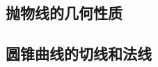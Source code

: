 \subsection{抛物线的几何性质}
\begin{Practice}
  \begin{question}
    \item 
    \item 
    \item 
  \end{question}
\end{Practice}
\begin{Exercise}
  \begin{question}
    \item 
    \item 
    \item 
    \item 
    \item 
    \item 
    \item 
    \item 
    \item 
    \item 
    \item 
    \item 
    \item 
    \item 
  \end{question}
\end{Exercise}
\subsection{圆锥曲线的切线和法线}

\begin{Practice}
  \begin{question}
    \item 
    \item 
  \end{question}
\end{Practice}
\begin{Exercise}
  \begin{question}
    \item 
    \item 
    \item 
    \item 
    \item 
    \item 
    \item 
    \item 
    \item 
    \item 
  \end{question}
\end{Exercise}
